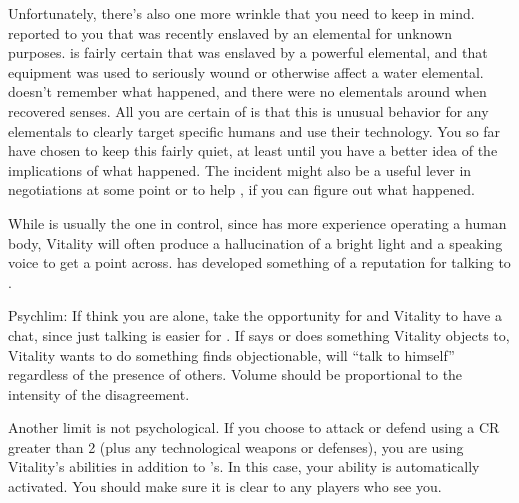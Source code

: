 \documentclass[char]{elementals}
\begin{document}
Unfortunately, there's also one more wrinkle that you need to keep in mind.  \cGD{} reported to you that \cGD{\they} was recently enslaved by an elemental for unknown purposes.  \cGD{\They} is fairly certain that \cGD{\they} was enslaved by a powerful elemental, and that \cGD{\their} equipment was used to seriously wound or otherwise affect a water elemental.  \cGD{} doesn't remember what happened, and there were no elementals around when \cGD{\they} recovered \cGD{\their} senses.  All you are certain of is that this is unusual behavior for any elementals to clearly target specific humans and use their technology.  You so far have chosen to keep this fairly quiet, at least until you have a better idea of the implications of what happened.  The incident might also be a useful lever in negotiations at some point or to help \cGD{}, if you can figure out what happened.

While \cAvatar{} is usually the one in control, since \cAvatar{\they} has more experience operating a human body, Vitality will often produce a hallucination of a bright light and a speaking voice to get a point across.  \cAvatar{} has developed something of a reputation for talking to \cAvatar{\themself}.



Psychlim:  If think you are alone, take the opportunity for \cAvatar{} and Vitality to have a chat, since just talking is easier for \cAvatar{}.  If \cAvatar{} says or does something Vitality objects to, Vitality wants \cAvatar{} to do something \cAvatar{\they} finds objectionable, \cAvatar{} will ``talk to himself'' regardless of the presence of others.  Volume should be proportional to the intensity of the disagreement.

Another limit is not psychological.  If you choose to attack or defend using a CR greater than 2 (plus any technological weapons or defenses), you are using Vitality's abilities in addition to \cAvatar{}'s.  In this case, your \aGlowInDark{} ability is automatically activated.  You should make sure it is clear to any players who see you.
\end{document}
